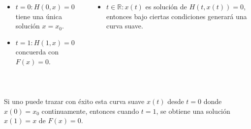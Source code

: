 \begin{frame}
	\begin{columns}
		\begin{column}{0.48\textwidth}
			\begin{itemize}
				\item

				      \begin{math}
					      t=0:
					      H\left(0,x\right)=
					      0
				      \end{math}
				      tiene una única solución $x=x_{0}$.

				\item

				      \begin{math}
					      t=1:
					      H\left(1,x\right)=
					      0
				      \end{math}
				      concuerda con
				      $F\left(x\right)=0$.
			\end{itemize}
		\end{column}
		\begin{column}{0.48\textwidth}
			\begin{itemize}
				\item

				      $t\in\mathbb{R}: x\left(t\right)$ es solución de
				      $H\left(t,x\left(t\right)\right)=0$, entonces bajo
				      ciertas condiciones generará una curva suave.
			\end{itemize}
		\end{column}
	\end{columns}

	\

	Si uno puede trazar con éxito esta curva suave $x\left(t\right)$
	desde $t=0$ donde $x\left(0\right)=x_{0}$ continuamente, entonces
	cuando $t=1$, se obtiene una solución $x\left(1\right)=x$
	de $F\left(x\right)=0$.
\end{frame}

